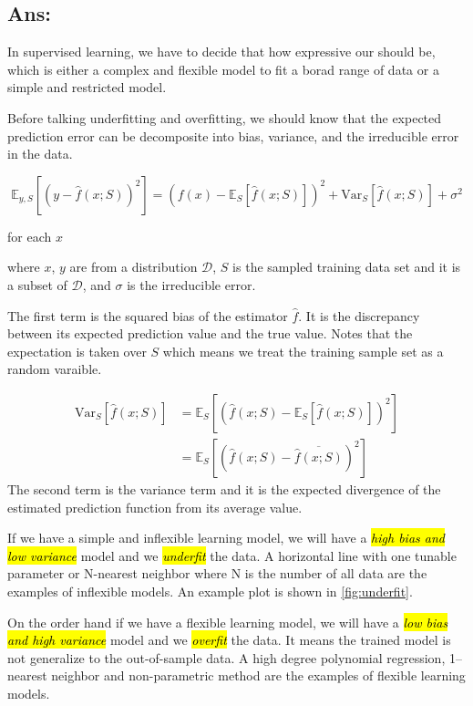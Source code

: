 \documentclass{kthreport}
\begin{document}
\subsection*{Ans:}

In supervised learning, we have to decide that how expressive our should be,
which is either a complex and flexible model to fit a borad range of data or
a simple and restricted model.

Before talking underfitting and overfitting, we should know that the expected prediction
error can be decomposite into bias, variance, and the irreducible error in the data.

\begin{equation}
    \mathbb{E}_{y,S}[(y-\hat{f}(x; S))^2] =
    (f(x) - \mathbb{E}_{S}[\hat{f}(x; S)])^2
    + \mathrm{Var}_{S}[\hat{f}(x; S)]
    + \sigma^2
\end{equation}

for each $x$

where $x$, $y$ are from a distribution $\mathcal{D}$, $S$ is the sampled training
data set and it is a subset of $\mathcal{D}$, and $\sigma$ is the irreducible error.

The first term is the squared bias of the estimator $\hat{f}$.
It is the discrepancy between its expected prediction value and the true value.
Notes that the expectation is taken over $S$ which means we treat the training sample
set as a random varaible.

\begin{align}
    \mathrm{Var}_{S}[\hat{f}(x; S)]
    &= \mathbb{E}_{S}[(\hat{f}(x; S) - \mathbb{E}_{S}[\hat{f}(x; S)])^2] \\
    &= \mathbb{E}_{S}[(\hat{f}(x; S) - \overline{\hat{f}(x; S)})^2]
\end{align}
The second term is the variance term and it is
the expected divergence of the estimated prediction function from its average value.


If we have a simple and inflexible learning model, we will have
a \emph{\hl{high bias and low variance}} model and we \emph{\hl{underfit}} the data.
A horizontal line with one tunable parameter or N-nearest neighbor
where N is the number of all data are the examples of inflexible models.
An example plot is shown in \cref{fig:underfit}.

On the order hand if we have a flexible learning model,
we will have a \emph{\hl{low bias and high variance}} model and we \emph{\hl{overfit}} the data.
It means the trained model is not generalize to the out-of-sample data. A high
degree polynomial regression, 1--nearest neighbor and non-parametric method are the
examples of flexible learning models.
\end{document}
